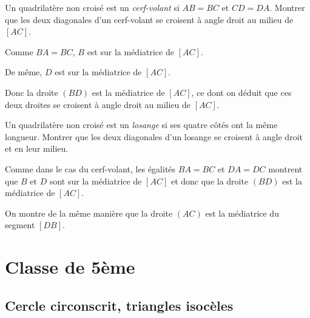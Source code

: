 \begin{exo}
Un quadrilatère non croisé est un \emph{cerf-volant} si $AB=BC$ et $CD=DA$. Montrer que les deux diagonales d'un cerf-volant se croisent à angle droit au milieu de $[AC]$.
\begin{sol}
Comme $BA=BC$, $B$ est sur la médiatrice de $[AC]$.

De même, $D$ est sur la médiatrice de $[AC]$.

Donc la droite $(BD)$ est la médiatrice de $[AC]$, ce dont on déduit que ces deux droites se croisent à angle droit au milieu de $[AC]$.
\end{sol}
\end{exo}

\begin{exo}[Losange]
Un quadrilatère non croisé est un \emph{losange} si ses quatre côtés ont la même longueur. Montrer que les deux diagonales d'un losange se croisent à angle droit et en leur milieu.
\begin{sol}
Comme dans le cas du cerf-volant, les égalités $BA=BC$ et $DA=DC$ montrent que $B$ et $D$ sont sur la médiatrice de $[AC]$ et donc que la droite $(BD)$ est la médiatrice de $[AC]$.

On montre de la même manière que la droite $(AC)$ est la médiatrice du segment $[DB]$.
\end{sol}
\end{exo}





\section{Classe de 5ème}




\subsection{Cercle circonscrit, triangles isocèles}



